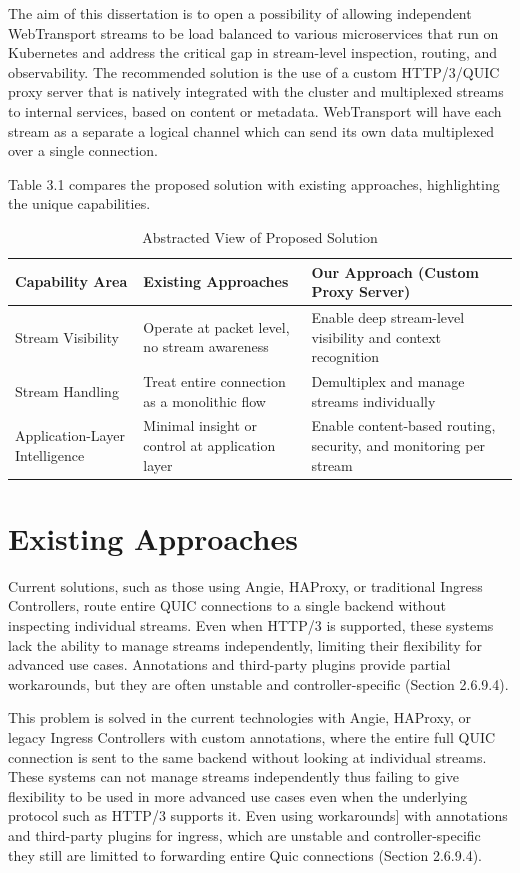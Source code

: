 The aim of this dissertation is to open a possibility of allowing independent WebTransport streams to be load balanced to various microservices that run on Kubernetes and  address the critical gap in stream-level inspection, routing, and observability. The recommended solution is the use of a custom HTTP/3/QUIC proxy server that is natively integrated with the cluster and multiplexed streams to internal services, based on content or metadata. WebTransport will have each stream as a separate a logical channel which can send its own data multiplexed over a single connection.


Table 3.1 compares the proposed solution with existing approaches, highlighting the unique capabilities.

\begin{table}[h]
\centering
\caption{Abstracted View of Proposed Solution}
\begin{tabular}{|p{4cm}|p{5cm}|p{5cm}|}
\hline
\textbf{Capability Area} & \textbf{Existing Approaches} & \textbf{Our Approach (Custom Proxy Server)} \\
\hline
Stream Visibility & Operate at packet level, no stream awareness & Enable deep stream-level visibility and context recognition \\
\hline
Stream Handling & Treat entire connection as a monolithic flow & Demultiplex and manage streams individually \\
\hline
Application-Layer Intelligence & Minimal insight or control at application layer & Enable content-based routing, security, and monitoring per stream \\
\hline
\end{tabular}
\end{table}

\section{Existing Approaches}
Current solutions, such as those using Angie, HAProxy, or traditional Ingress Controllers, route entire QUIC connections to a single backend without inspecting individual streams. Even when HTTP/3 is supported, these systems lack the ability to manage streams independently, limiting their flexibility for advanced use cases. Annotations and third-party plugins provide partial workarounds, but they are often unstable and controller-specific (Section 2.6.9.4).

This problem is solved in the current technologies with Angie, HAProxy, or legacy Ingress Controllers with custom annotations, where the entire full QUIC connection is sent to the same backend without looking at individual streams. These systems can not manage streams independently thus failing to give flexibility to be used in more advanced use cases even when the underlying protocol such as HTTP/3 supports it. Even using workarounds] with annotations and third-party plugins for ingress, which are unstable and controller-specific they still are limitted to forwarding entire Quic connections (Section 2.6.9.4).

